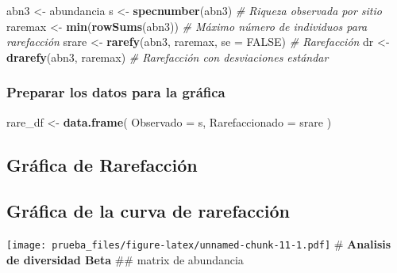 \documentclass[
]{article}
\newenvironment{Shaded}{\begin{snugshade}}{\end{snugshade}}
\newcommand{\AttributeTok}[1]{\textcolor[rgb]{0.13,0.29,0.53}{#1}}
\newcommand{\CommentTok}[1]{\textcolor[rgb]{0.56,0.35,0.01}{\textit{#1}}}
\newcommand{\ConstantTok}[1]{\textcolor[rgb]{0.56,0.35,0.01}{#1}}
\newcommand{\FunctionTok}[1]{\textcolor[rgb]{0.13,0.29,0.53}{\textbf{#1}}}
\newcommand{\NormalTok}[1]{#1}
\newcommand{\OtherTok}[1]{\textcolor[rgb]{0.56,0.35,0.01}{#1}}
\begin{document}
\begin{Shaded}
\begin{Highlighting}[]
\NormalTok{abn3 }\OtherTok{\textless{}{-}}\NormalTok{ abundancia}
\NormalTok{s }\OtherTok{\textless{}{-}} \FunctionTok{specnumber}\NormalTok{(abn3)  }\CommentTok{\# Riqueza observada por sitio}
\NormalTok{raremax }\OtherTok{\textless{}{-}} \FunctionTok{min}\NormalTok{(}\FunctionTok{rowSums}\NormalTok{(abn3))  }\CommentTok{\# Máximo número de individuos para rarefacción}
\NormalTok{srare }\OtherTok{\textless{}{-}} \FunctionTok{rarefy}\NormalTok{(abn3, raremax, }\AttributeTok{se =} \ConstantTok{FALSE}\NormalTok{)  }\CommentTok{\# Rarefacción}
\NormalTok{dr }\OtherTok{\textless{}{-}} \FunctionTok{drarefy}\NormalTok{(abn3, raremax)  }\CommentTok{\# Rarefacción con desviaciones estándar}
\end{Highlighting}
\end{Shaded}

\hypertarget{preparar-los-datos-para-la-gruxe1fica}{%
\subsubsection{Preparar los datos para la
gráfica}\label{preparar-los-datos-para-la-gruxe1fica}}

\begin{Shaded}
\begin{Highlighting}[]
\NormalTok{rare\_df }\OtherTok{\textless{}{-}} \FunctionTok{data.frame}\NormalTok{(}
  \AttributeTok{Observado =}\NormalTok{ s,}
  \AttributeTok{Rarefaccionado =}\NormalTok{ srare}
\NormalTok{)}
\end{Highlighting}
\end{Shaded}

\hypertarget{gruxe1fica-de-rarefacciuxf3n}{%
\subsection{Gráfica de Rarefacción}\label{gruxe1fica-de-rarefacciuxf3n}}

\hypertarget{gruxe1fica-de-la-curva-de-rarefacciuxf3n}{%
\subsection{Gráfica de la curva de
rarefacción}\label{gruxe1fica-de-la-curva-de-rarefacciuxf3n}}

\texttt{[image: prueba\_files/figure-latex/unnamed-chunk-11-1.pdf]} \#
\textbf{Analisis de diversidad Beta} \#\# matrix de abundancia
\end{document}
